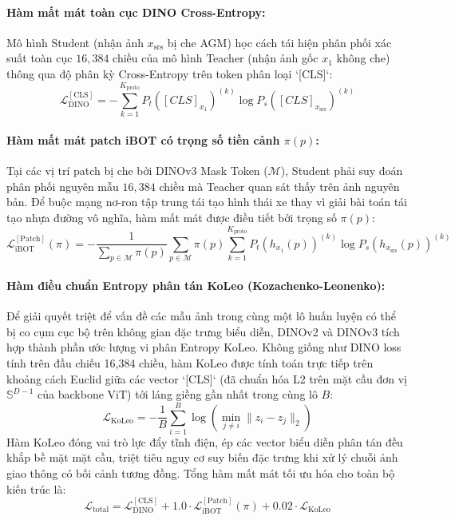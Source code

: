 \documentclass[11pt,a4paper]{article}
\begin{document}
\paragraph{Hàm mất mát toàn cục DINO Cross-Entropy:}
Mô hình Student (nhận ảnh $x_{\text{srs}}$ bị che AGM) học cách tái hiện phân phối xác suất toàn cục $16,384$ chiều của mô hình Teacher (nhận ảnh gốc $x_1$ không che) thông qua độ phân kỳ Cross-Entropy trên token phân loại `[CLS]`:
\begin{equation}
    \mathcal{L}_{\text{DINO}}^{[\text{CLS}]} = - \sum_{k=1}^{K_{\text{proto}}} P_t([CLS]_{x_1})^{(k)} \log P_s([CLS]_{x_{\text{srs}}})^{(k)}
\end{equation}

\paragraph{Hàm mất mát patch iBOT có trọng số tiền cảnh $\pi(p)$:}
Tại các vị trí patch bị che bởi DINOv3 Mask Token ($\mathcal{M}$), Student phải suy đoán phân phối nguyên mẫu $16,384$ chiều mà Teacher quan sát thấy trên ảnh nguyên bản. Để buộc mạng nơ-ron tập trung tái tạo hình thái xe thay vì giải bài toán tái tạo nhựa đường vô nghĩa, hàm mất mát được điều tiết bởi trọng số $\pi(p)$:
\begin{equation}
    \mathcal{L}_{\text{iBOT}}^{[\text{Patch}]}(\pi) = - \frac{1}{\sum_{p \in \mathcal{M}} \pi(p)} \sum_{p \in \mathcal{M}} \pi(p) \sum_{k=1}^{K_{\text{proto}}} P_t(h_{x_1}(p))^{(k)} \log P_s(h_{x_{\text{srs}}}(p))^{(k)}
\end{equation}

\paragraph{Hàm điều chuẩn Entropy phân tán KoLeo (Kozachenko-Leonenko):}
Để giải quyết triệt để vấn đề các mẫu ảnh trong cùng một lô huấn luyện có thể bị co cụm cục bộ trên không gian đặc trưng biểu diễn, DINOv2 và DINOv3 tích hợp thành phần ước lượng vi phân Entropy KoLeo. Không giống như DINO loss tính trên đầu chiếu 16,384 chiều, hàm KoLeo được tính toán trực tiếp trên khoảng cách Euclid giữa các vector `[CLS]` (đã chuẩn hóa L2 trên mặt cầu đơn vị $\mathbb{S}^{D-1}$ của backbone ViT) tới láng giềng gần nhất trong cùng lô $B$:
\begin{equation}
    \mathcal{L}_{\text{KoLeo}} = - \frac{1}{B} \sum_{i=1}^B \log \left( \min_{j \ne i} \|z_i - z_j\|_2 \right)
\end{equation}
Hàm KoLeo đóng vai trò lực đẩy tĩnh điện, ép các vector biểu diễn phân tán đều khắp bề mặt mặt cầu, triệt tiêu nguy cơ suy biến đặc trưng khi xử lý chuỗi ảnh giao thông có bối cảnh tương đồng. Tổng hàm mất mát tối ưu hóa cho toàn bộ kiến trúc là:
\begin{equation}
    \mathcal{L}_{\text{total}} = \mathcal{L}_{\text{DINO}}^{[\text{CLS}]} + 1.0 \cdot \mathcal{L}_{\text{iBOT}}^{[\text{Patch}]}(\pi) + 0.02 \cdot \mathcal{L}_{\text{KoLeo}}
\end{equation}
\end{document}
